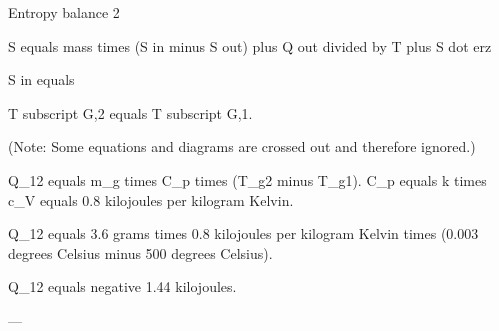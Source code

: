 Entropy balance 2  

S equals mass times (S in minus S out) plus Q out divided by T plus S dot erz  

S in equals

T subscript G,2 equals T subscript G,1.  

(Note: Some equations and diagrams are crossed out and therefore ignored.)

Q_12 equals m_g times C_p times (T_g2 minus T_g1).  
C_p equals k times c_V equals 0.8 kilojoules per kilogram Kelvin.  

Q_12 equals 3.6 grams times 0.8 kilojoules per kilogram Kelvin times (0.003 degrees Celsius minus 500 degrees Celsius).  

Q_12 equals negative 1.44 kilojoules.  

---
